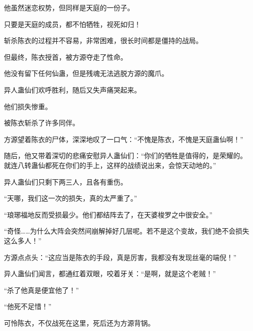 \begin{this_body}
他虽然迷恋权势，但同样是天庭的一份子。

只要是天庭的成员，都不怕牺牲，视死如归！

斩杀陈衣的过程并不容易，非常困难，很长时间都是僵持的战局。

但最终，陈衣授首，被方源夺走了性命。

他没有留下任何仙蛊，但是残魂无法逃脱方源的魔爪。

异人蛊仙们欢呼胜利，随后又失声痛哭起来。

他们损失惨重。

被陈衣斩杀了许多同伴。

方源望着陈衣的尸体，深深地叹了一口气：“不愧是陈衣，不愧是天庭蛊仙啊！”

随后，他又带着深切的悲痛安慰异人蛊仙们：“你们的牺牲是值得的，是荣耀的。就连八转蛊仙都死在你们的手上，这样的战绩说出来，会惊天动地的。”

异人蛊仙们只剩下两三人，且各有重伤。

“天哪，我们这一次的损失，真的太严重了。”

“琅琊福地反而受损最少。他们都结阵去了，在天婆梭罗之中很安全。”

“奇怪……为什么大阵会突然间崩解掉好几层呢。若不是这个变故，我们绝不会损失这么多人！”

方源点点头：“这应当是陈衣的手段，真是厉害，我都没有发现丝毫的端倪！”

异人蛊仙们闻言，都通红着双眼，咬着牙关：“是啊，就是这个老贼！”

“杀了他真是便宜他了！”

“他死不足惜！”

可怜陈衣，不仅战死在这里，死后还为方源背锅。

\end{this_body}

